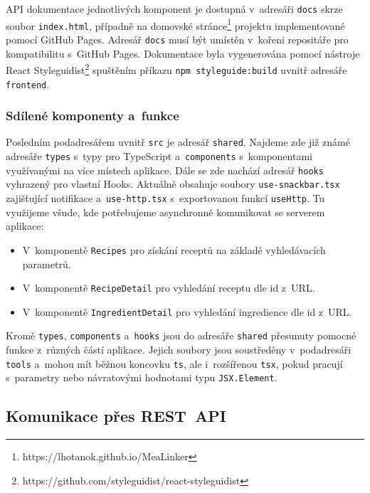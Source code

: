 API dokumentace jednotlivých komponent je dostupná v~adresáři \texttt{docs} skrze soubor \texttt{index.html}, případně na domovské stránce\footnote{https://lhotanok.github.io/MeaLinker} projektu implementované pomocí GitHub Pages. Adresář \texttt{docs} musí být umístěn v~kořeni repositáře pro kompatibilitu s~GitHub Pages. Dokumentace byla vygenerována pomocí nástroje React Styleguidist\footnote{https://github.com/styleguidist/react-styleguidist} spuštěním příkazu \texttt{npm styleguide:build} uvnitř adresáře \texttt{frontend}.

\subsubsection{Sdílené komponenty a~funkce}

Posledním podadresářem uvnitř \texttt{src} je adresář \texttt{shared}. Najdeme zde již zná\-mé adresáře \texttt{types} s~typy pro TypeScript a~\texttt{components} s~komponentami využívanými na více místech aplikace. Dále se zde nachází adresář \texttt{hooks} vyhrazený pro vlastní Hooks. Aktuálně obsahuje soubory \texttt{use-snackbar.tsx} zajišťující notifikace a~\texttt{use-http.tsx} s~exportovanou funkcí \texttt{useHttp}. Tu využijeme všude, kde potřebujeme asynchronně komunikovat se serverem aplikace: 
\begin{itemize}
    \item V~komponentě \texttt{Recipes} pro získání receptů na základě vyhledávacích parametrů.
    \item V~komponentě \texttt{RecipeDetail} pro vyhledání receptu dle id z~URL.
    \item V~komponentě \texttt{IngredientDetail} pro vyhledání ingredience dle id z~URL.
\end{itemize}
Kromě \texttt{types}, \texttt{components} a~\texttt{hooks} jsou do adresáře \texttt{shared} přesunuty pomocné funkce z~různých částí aplikace. Jejich soubory jsou soustředěny v~podadresáři \texttt{tools} a~mohou mít běžnou koncovku \texttt{ts}, ale i~rozšířenou \texttt{tsx}, pokud pracují s~parametry nebo návratovými hodnotami typu \texttt{JSX.Element}.

\subsection{Komunikace přes REST~API}

